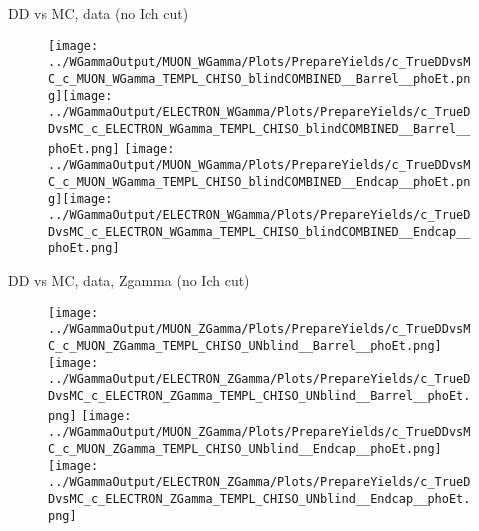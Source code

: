 \documentclass{beamer}
\begin{document}
\begin{frame}{DD vs MC, data (no Ich cut)}
  \begin{figure}
    \centering
    \texttt{[image: ../WGammaOutput/MUON\_WGamma/Plots/PrepareYields/c\_TrueDDvsMC\_c\_MUON\_WGamma\_TEMPL\_CHISO\_blindCOMBINED\_\_Barrel\_\_phoEt.png]}\texttt{[image: ../WGammaOutput/ELECTRON\_WGamma/Plots/PrepareYields/c\_TrueDDvsMC\_c\_ELECTRON\_WGamma\_TEMPL\_CHISO\_blindCOMBINED\_\_Barrel\_\_phoEt.png]}
    \texttt{[image: ../WGammaOutput/MUON\_WGamma/Plots/PrepareYields/c\_TrueDDvsMC\_c\_MUON\_WGamma\_TEMPL\_CHISO\_blindCOMBINED\_\_Endcap\_\_phoEt.png]}\texttt{[image: ../WGammaOutput/ELECTRON\_WGamma/Plots/PrepareYields/c\_TrueDDvsMC\_c\_ELECTRON\_WGamma\_TEMPL\_CHISO\_blindCOMBINED\_\_Endcap\_\_phoEt.png]}
  \end{figure}
\end{frame}

\begin{frame}{DD vs MC, data, Zgamma (no Ich cut)}
  \begin{figure}
    \centering
    \texttt{[image: ../WGammaOutput/MUON\_ZGamma/Plots/PrepareYields/c\_TrueDDvsMC\_c\_MUON\_ZGamma\_TEMPL\_CHISO\_UNblind\_\_Barrel\_\_phoEt.png]}\texttt{[image: ../WGammaOutput/ELECTRON\_ZGamma/Plots/PrepareYields/c\_TrueDDvsMC\_c\_ELECTRON\_ZGamma\_TEMPL\_CHISO\_UNblind\_\_Barrel\_\_phoEt.png]}
    \texttt{[image: ../WGammaOutput/MUON\_ZGamma/Plots/PrepareYields/c\_TrueDDvsMC\_c\_MUON\_ZGamma\_TEMPL\_CHISO\_UNblind\_\_Endcap\_\_phoEt.png]}\texttt{[image: ../WGammaOutput/ELECTRON\_ZGamma/Plots/PrepareYields/c\_TrueDDvsMC\_c\_ELECTRON\_ZGamma\_TEMPL\_CHISO\_UNblind\_\_Endcap\_\_phoEt.png]}
  \end{figure}
\end{frame}
\end{document}
